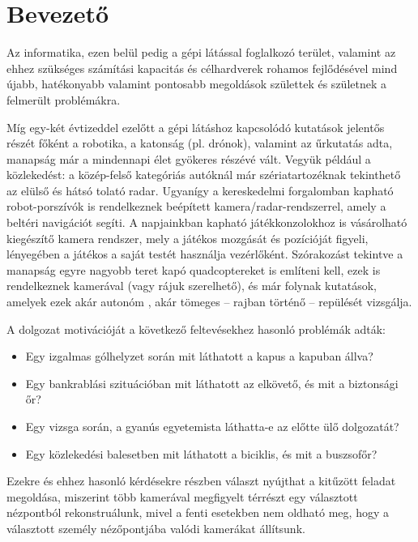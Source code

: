\chapter{Bevezető}

Az informatika, ezen belül pedig a gépi látással foglalkozó terület, valamint az ehhez szükséges számítási kapacitás és célhardverek rohamos fejlődésével mind újabb, hatékonyabb valamint pontosabb megoldások születtek és születnek a felmerült problémákra.

Míg egy-két évtizeddel ezelőtt a gépi látáshoz kapcsolódó kutatások jelentős részét főként a robotika, a katonság (pl. drónok), valamint az űrkutatás adta, manapság már a mindennapi élet gyökeres részévé vált. Vegyük például a közlekedést: a közép-felső kategóriás autóknál már szériatartozéknak tekinthető az elülső és hátsó tolató radar. Ugyanígy a kereskedelmi forgalomban kapható robot-porszívók is rendelkeznek beépített kamera/radar-rendszerrel, amely a beltéri navigációt segíti. A napjainkban kapható játékkonzolokhoz is vásárolható kiegészítő kamera rendszer, mely a játékos mozgását és pozícióját figyeli, lényegében a játékos a saját testét használja vezérlőként. Szórakozást tekintve a manapság egyre nagyobb teret kapó quadcoptereket \cite{quadropter} is említeni kell, ezek is rendelkeznek kamerával (vagy rájuk szerelhető), és már folynak kutatások, amelyek ezek akár autonóm \cite{quad-autonomous}, akár tömeges \cite{quad-swarm} -- rajban történő -- repülését vizsgálja.

A dolgozat motivációját a következő feltevésekhez hasonló problémák adták:
\begin{itemize}
\item Egy izgalmas gólhelyzet során mit láthatott a kapus a kapuban állva?
\item Egy bankrablási szituációban mit láthatott az elkövető, és mit a biztonsági őr?
\item Egy vizsga során, a gyanús egyetemista láthatta-e az előtte ülő dolgozatát?
\item Egy közlekedési balesetben mit láthatott a biciklis, és mit a buszsofőr?
\end{itemize}

Ezekre és ehhez hasonló kérdésekre részben választ nyújthat a kitűzött feladat megoldása, miszerint több kamerával megfigyelt térrészt egy választott nézpontból rekonstruálunk, mivel a fenti esetekben nem oldható meg, hogy a választott személy nézőpontjába valódi kamerákat állítsunk.

